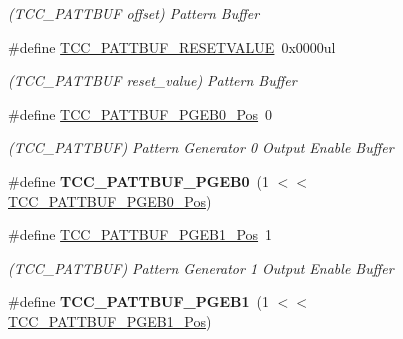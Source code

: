 \begin{DoxyCompactItemize}
\begin{DoxyCompactList}\small\item\em (T\+C\+C\+\_\+\+P\+A\+T\+T\+B\+U\+F offset) Pattern Buffer \end{DoxyCompactList}\item 
\hypertarget{group___s_a_m_l21___t_c_c_gad9c9f8d6458435a9b889da2930301496}{}\#define \hyperlink{group___s_a_m_l21___t_c_c_gad9c9f8d6458435a9b889da2930301496}{T\+C\+C\+\_\+\+P\+A\+T\+T\+B\+U\+F\+\_\+\+R\+E\+S\+E\+T\+V\+A\+L\+U\+E}~0x0000ul\label{group___s_a_m_l21___t_c_c_gad9c9f8d6458435a9b889da2930301496}

\begin{DoxyCompactList}\small\item\em (T\+C\+C\+\_\+\+P\+A\+T\+T\+B\+U\+F reset\+\_\+value) Pattern Buffer \end{DoxyCompactList}\item 
\hypertarget{group___s_a_m_l21___t_c_c_gadf208af7d836025a1cf8b827df38a0a1}{}\#define \hyperlink{group___s_a_m_l21___t_c_c_gadf208af7d836025a1cf8b827df38a0a1}{T\+C\+C\+\_\+\+P\+A\+T\+T\+B\+U\+F\+\_\+\+P\+G\+E\+B0\+\_\+\+Pos}~0\label{group___s_a_m_l21___t_c_c_gadf208af7d836025a1cf8b827df38a0a1}

\begin{DoxyCompactList}\small\item\em (T\+C\+C\+\_\+\+P\+A\+T\+T\+B\+U\+F) Pattern Generator 0 Output Enable Buffer \end{DoxyCompactList}\item 
\hypertarget{group___s_a_m_l21___t_c_c_ga38ad88c1be6b00dab3d3c92b49c6e674}{}\#define {\bfseries T\+C\+C\+\_\+\+P\+A\+T\+T\+B\+U\+F\+\_\+\+P\+G\+E\+B0}~(1 $<$$<$ \hyperlink{group___s_a_m_l21___t_c_c_gadf208af7d836025a1cf8b827df38a0a1}{T\+C\+C\+\_\+\+P\+A\+T\+T\+B\+U\+F\+\_\+\+P\+G\+E\+B0\+\_\+\+Pos})\label{group___s_a_m_l21___t_c_c_ga38ad88c1be6b00dab3d3c92b49c6e674}

\item 
\hypertarget{group___s_a_m_l21___t_c_c_ga34f29695ef08f4b100f4f7a0d75b2735}{}\#define \hyperlink{group___s_a_m_l21___t_c_c_ga34f29695ef08f4b100f4f7a0d75b2735}{T\+C\+C\+\_\+\+P\+A\+T\+T\+B\+U\+F\+\_\+\+P\+G\+E\+B1\+\_\+\+Pos}~1\label{group___s_a_m_l21___t_c_c_ga34f29695ef08f4b100f4f7a0d75b2735}

\begin{DoxyCompactList}\small\item\em (T\+C\+C\+\_\+\+P\+A\+T\+T\+B\+U\+F) Pattern Generator 1 Output Enable Buffer \end{DoxyCompactList}\item 
\hypertarget{group___s_a_m_l21___t_c_c_ga98e7940cd4dadc347fd5201ff7aa77c7}{}\#define {\bfseries T\+C\+C\+\_\+\+P\+A\+T\+T\+B\+U\+F\+\_\+\+P\+G\+E\+B1}~(1 $<$$<$ \hyperlink{group___s_a_m_l21___t_c_c_ga34f29695ef08f4b100f4f7a0d75b2735}{T\+C\+C\+\_\+\+P\+A\+T\+T\+B\+U\+F\+\_\+\+P\+G\+E\+B1\+\_\+\+Pos})\label{group___s_a_m_l21___t_c_c_ga98e7940cd4dadc347fd5201ff7aa77c7}


\end{DoxyCompactItemize}
